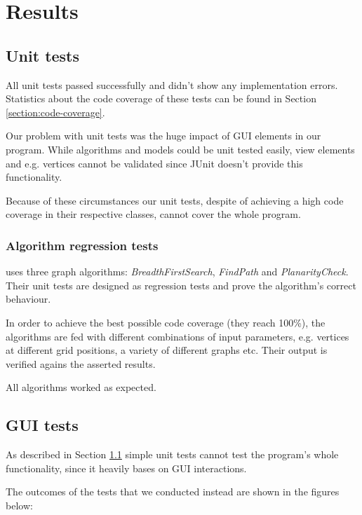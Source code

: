 \section{Results}
\label{section:results}

\subsection{Unit tests}
\label{section:unit-tests}

All unit tests passed successfully and didn't show any implementation errors. Statistics about the code coverage of these tests can be found in Section \ref{section:code-coverage}.\par
Our problem with unit tests was the huge impact of GUI elements in our program. While algorithms and models could be unit tested easily, view elements and e.g. vertices cannot be validated since JUnit doesn't provide this functionality.\par
Because of these circumstances our unit tests, despite of achieving a high code coverage in their respective classes, cannot cover the whole program.\par

\subsubsection{Algorithm regression tests}

\graphioli uses three graph algorithms: \emph{BreadthFirstSearch}, \emph{FindPath} and \emph{PlanarityCheck}. Their unit tests are designed as regression tests and prove the algorithm's correct behaviour.\par
In order to achieve the best possible code coverage (they reach 100\%), the algorithms are fed with different combinations of input parameters, e.g. vertices at different grid positions, a variety of different graphs etc. Their output is verified agains the asserted results.\par
All algorithms worked as expected.\par

\subsection{GUI tests}

As described in Section \ref{section:unit-tests} simple unit tests cannot test the program's whole functionality, since it heavily bases on GUI interactions.\par
The outcomes of the tests that we conducted instead are shown in the figures below:\par

